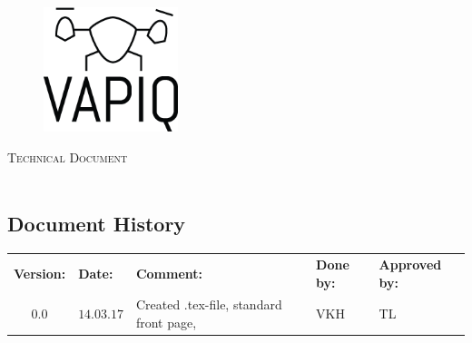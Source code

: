 \documentclass{article}
\author{Aleksander Holthe  \\ Katrine Sundal Haune \\ Kent Kjeldaas \\ Stian Fredriksen \\ Tomas Lyngroth \\ Vanja Katinka Halvorsen}
\makeatletter
\let\vapiqteam\@author
\makeatother
\begin{document}
\begin{titlepage}
    \centering
    \pagecolor{gainsboro}
	\\[3.0 cm]
    \begin{figure}[h]
        \centering
        \includegraphics[width = 0.35\textwidth]{VAPIQ-PICTURES//Logo2_Tilted.png}
        \\[2.0 cm] 
    \end{figure}                              
    \textsc{\Huge Technical Document}  
    \\[1 cm]
    \textsc{\Large }   
    \\[3.0 cm]
	\large \vapiqteam      
\end{titlepage}
\pagecolor{white}


\begin{center}
\section*{\textbf{Document History}}
\begin{tabular}{cllll}
\rowcolor{cadetgrey}
\textbf{Version:}    &\textbf{Date:} 	 &\textbf{Comment:}    &\textbf{Done by:}   &\textbf{Approved by:}  \\

0.0       & $14.03.17$   & Created .tex-file, standard front page,  & VKH  & TL \\

\end{tabular}                                                                   
\end{center}
\end{document}
